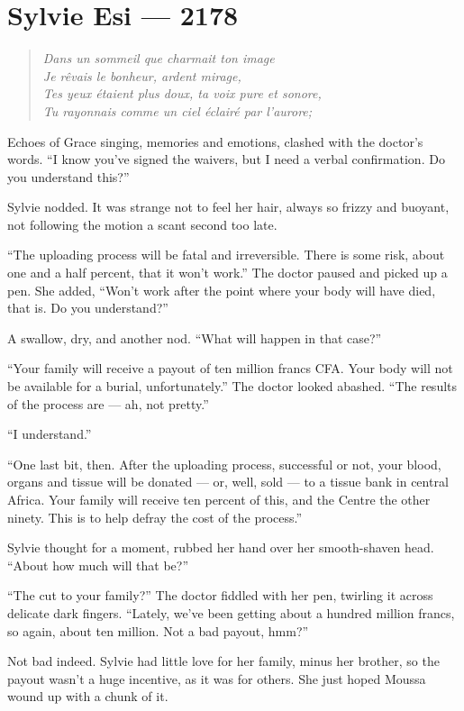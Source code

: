 \chapter*{Sylvie Esi — 2178}

\begin{quote}
\emph{Dans un sommeil que charmait ton image\\
Je rêvais le bonheur, ardent mirage,\\
Tes yeux étaient plus doux, ta voix pure et sonore,\\
Tu rayonnais comme un ciel éclairé par l'aurore;}
\end{quote}

Echoes of Grace singing, memories and emotions, clashed with the doctor's words. ``I know you've signed the waivers, but I need a verbal confirmation. Do you understand this?''

Sylvie nodded. It was strange not to feel her hair, always so frizzy and buoyant, not following the motion a scant second too late.

``The uploading process will be fatal and irreversible. There is some risk, about one and a half percent, that it won't work.'' The doctor paused and picked up a pen. She added, ``Won't work after the point where your body will have died, that is. Do you understand?''

A swallow, dry, and another nod. ``What will happen in that case?''

``Your family will receive a payout of ten million francs CFA. Your body will not be available for a burial, unfortunately.'' The doctor looked abashed. ``The results of the process are --- ah, not pretty.''

``I understand.''

``One last bit, then. After the uploading process, successful or not, your blood, organs and tissue will be donated --- or, well, sold --- to a tissue bank in central Africa. Your family will receive ten percent of this, and the Centre the other ninety. This is to help defray the cost of the process.''

Sylvie thought for a moment, rubbed her hand over her smooth-shaven head. ``About how much will that be?''

``The cut to your family?'' The doctor fiddled with her pen, twirling it across delicate dark fingers. ``Lately, we've been getting about a hundred million francs, so again, about ten million. Not a bad payout, hmm?''

Not bad indeed. Sylvie had little love for her family, minus her brother, so the payout wasn't a huge incentive, as it was for others. She just hoped Moussa wound up with a chunk of it.

